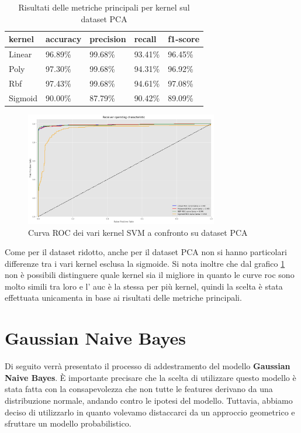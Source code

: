     \begin{table}[!ht]
        \centering
        \begin{tabular}{|l|l|l|l|l|}
        \hline
            \textbf{kernel} & \textbf{accuracy} & \textbf{precision} & \textbf{recall} & \textbf{f1-score} \\ \hline
            Linear & 96.89\% & 99.68\% & 93.41\% & 96.45\%  \\ \hline
            Poly & 97.30\% & 99.68\% & 94.31\% & 96.92\%  \\ \hline
            Rbf & 97.43\% & 99.68\% & 94.61\% & 97.08\%  \\ \hline
            Sigmoid & 90.00\% & 87.79\% & 90.42\% & 89.09\%  \\ \hline
        \end{tabular}
        \caption{Risultati delle metriche principali per kernel sul dataset PCA}
        \label{tab:top_metrics_kernels_pca}
    \end{table}

    \begin{figure}[!ht]
        \centering
        \includegraphics[width=0.75\textwidth]{img/svm/SVM_roc_pca.png}
        \caption{Curva ROC dei vari kernel SVM a confronto su dataset PCA}
        \label{fig:roc_SVM_PCA}
    \end{figure}

    Come per il dataset ridotto, anche per il dataset PCA non si hanno particolari
    differenze tra i vari kernel esclusa la sigmoide. Si nota inoltre che dal 
    grafico \ref{fig:roc_SVM_PCA} non è possibili distinguere quale kernel sia
    il migliore in quanto le curve roc sono molto simili tra loro e l' auc è la
    stessa per più kernel, quindi la scelta è stata effettuata unicamenta in base
    ai risultati delle metriche principali. 

\newpage

\section{Gaussian Naive Bayes}
Di seguito verrà presentato il processo di addestramento del modello
\textbf{Gaussian Naive Bayes}. È importante precisare che la scelta di utilizzare
questo modello è stata fatta con la consapevolezza che non tutte le features
derivano da una distribuzione normale, andando contro le ipotesi del modello.
Tuttavia, abbiamo deciso di utilizzarlo in quanto volevamo distaccarci da un
approccio geometrico e sfruttare un modello probabilistico.

